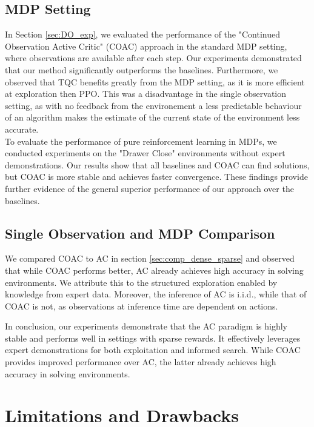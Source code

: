 \subsection{MDP Setting}
In Section \ref{sec:DO_exp}, we evaluated the performance of the "Continued Observation Active Critic" (COAC) approach in the standard MDP setting, 
where observations are available after each step. Our experiments demonstrated that our 
method significantly outperforms the baselines. Furthermore, we observed that TQC benefits greatly 
from the MDP setting, as it is more efficient at exploration then PPO. This was a disadvantage in the single observation setting, as with no feedback 
from the environement a less predictable behaviour of an algorithm makes the estimate of the current state of the environment less accurate.\\
To evaluate the performance of pure reinforcement learning in MDPs, we conducted experiments on the "Drawer Close" 
environments without expert demonstrations. Our results show that all baselines and COAC can find solutions, but COAC is more stable and achieves 
faster convergence. These findings provide further evidence of the general superior performance of our approach over the baselines. 

\subsection{Single Observation and MDP Comparison}
We compared COAC to AC in section \ref{sec:comp_dense_sparse} and observed that while COAC performs better, 
AC already achieves high accuracy in solving environments. We attribute this to the structured exploration enabled by knowledge from 
expert data. Moreover, the inference of AC is i.i.d., while that of COAC is not, as observations at inference time are dependent on actions. 

In conclusion, our experiments demonstrate that the AC paradigm is highly stable and performs well in settings with sparse rewards. 
It effectively leverages expert demonstrations for both exploitation and informed search. While COAC provides improved performance over 
AC, the latter already achieves high accuracy in solving environments.

\section{Limitations and Drawbacks}
